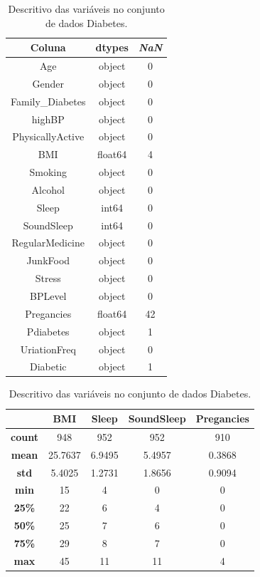 \begin{table}[H]
\begin{subtable}[c]{0.5\textwidth}
\label{descritivo:diabete}
\centering
\begin{tabular}{|c|c|c|}
 \hline
\textbf{Coluna} & \textbf{dtypes} & \textbf{\textit{NaN}}\\
  \hline
Age                &  object & 0\\
\hline
Gender             &  object & 0\\
\hline
Family\_Diabetes   &   object & 0 \\
\hline
highBP             &  object & 0 \\
\hline
PhysicallyActive   &  object & 0 \\
\hline
BMI                & float64 & 4 \\
\hline
Smoking            &  object & 0 \\
\hline
Alcohol            &  object & 0 \\
\hline
Sleep              &   int64 & 0 \\
\hline
SoundSleep         &   int64 & 0 \\
\hline
RegularMedicine    &  object & 0 \\
\hline
JunkFood           &  object & 0 \\
\hline
Stress             &  object & 0 \\
\hline
BPLevel            &  object & 0 \\
\hline
Pregancies         & float64 & 42 \\
\hline
Pdiabetes          &  object & 1 \\
\hline
UriationFreq       &  object & 0 \\
\hline
Diabetic           &  object & 1 \\
\hline
\end{tabular}
\end{subtable}
\begin{subtable}[c]{0.5\textwidth}
\centering
\begin{tabular}{|c|c|c|c|c|}
\hline
	& \textbf{BMI}	& \textbf{Sleep}	& \textbf{SoundSleep}	& \textbf{Pregancies}\\
\hline
\textbf{count}	& 948	& 952	& 952	& 910 \\
\hline
\textbf{mean}	& 25.7637	& 6.9495	& 5.4957	& 0.3868 \\
\hline
\textbf{std}	    & 5.4025	& 1.2731	& 1.8656	& 0.9094 \\
\hline
\textbf{min}	    & 15	& 4	& 0	& 0 \\
\hline
\textbf{25\%}	& 22	& 6	& 4	& 0 \\
\hline
\textbf{50\%}	& 25	& 7	& 6	& 0 \\
\hline
\textbf{75\%}	& 29	& 8	& 7	& 0 \\
\hline
\textbf{max}	    & 45	& 11	& 11	& 4 \\
\hline
\end{tabular}
\end{subtable}
\caption{Descritivo das variáveis no conjunto de dados Diabetes.}
\end{table}

